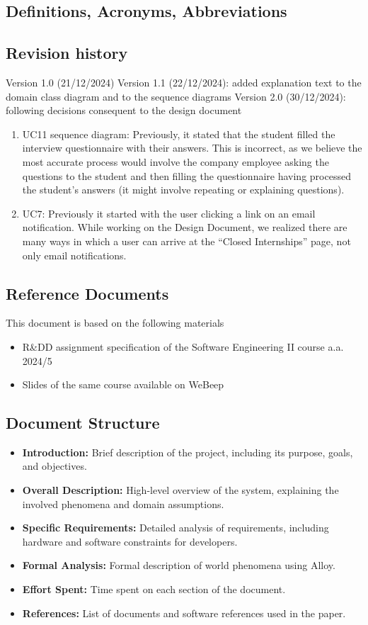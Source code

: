 \subsection{Definitions, Acronyms, Abbreviations}
\subsection{Revision history}
Version 1.0 (21/12/2024)
Version 1.1 (22/12/2024): added explanation text to the domain class diagram and to the sequence diagrams
Version 2.0 (30/12/2024): following decisions consequent to the design document
\begin{enumerate}
    \item UC11 sequence diagram: Previously, it stated that the student filled the interview questionnaire with their answers. This is incorrect, as we believe the most accurate process would involve the company employee asking the questions to the student and then filling the questionnaire having processed the student's answers (it might involve repeating or explaining questions).
    \item UC7: Previously it started with the user clicking a link on an email notification. While working on the Design Document, we realized there are many ways in which a user can arrive at the ``Closed Internships'' page, not only email notifications.
\end{enumerate}
\subsection{Reference Documents}
This document is based on the following materials
\begin{itemize}
    \item R\&DD assignment specification of the Software Engineering II course a.a. 2024/5
    \item Slides of the same course available on WeBeep
\end{itemize}


\subsection{Document Structure}
\begin{itemize}
  \item \textbf{Introduction:} Brief description of the project, including its purpose, goals, and objectives.
  \item \textbf{Overall Description:} High-level overview of the system, explaining the involved phenomena and domain assumptions.
  \item \textbf{Specific Requirements:} Detailed analysis of requirements, including hardware and software constraints for developers.
  \item \textbf{Formal Analysis:} Formal description of world phenomena using Alloy.
  \item \textbf{Effort Spent:} Time spent on each section of the document.
  \item \textbf{References:} List of documents and software references used in the paper.
\end{itemize}
